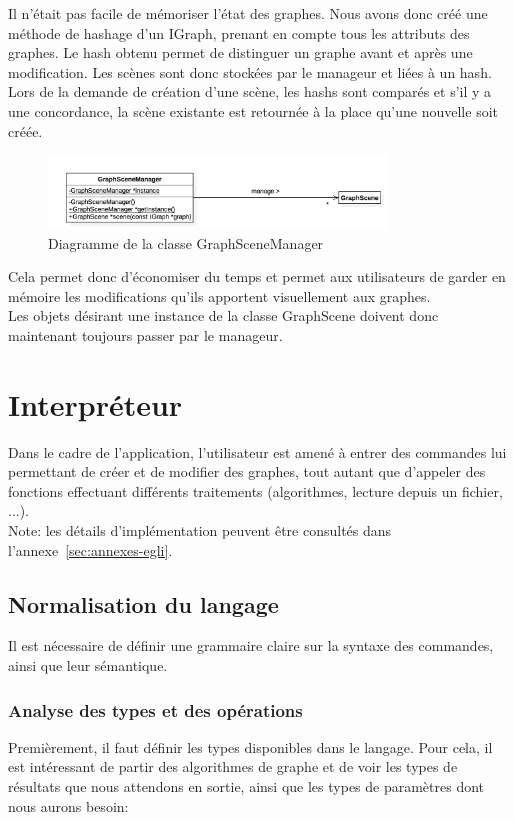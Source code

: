 \documentclass[french]{article}
\begin{document}
	Il n'était pas facile de mémoriser l'état des graphes. Nous avons donc créé une méthode de hashage d'un IGraph, prenant en compte tous les attributs des graphes. Le hash obtenu permet de distinguer un graphe avant et après une modification. Les scènes sont donc stockées par le manageur et liées à un hash. Lors de la demande de création d'une scène, les hashs sont comparés et s'il y a une concordance, la scène existante est retournée à la place qu'une nouvelle soit créée.
	
	\begin{figure}[H]
		\centering
		\includegraphics[width=0.8\textwidth]{Conception/visualization/graphscenemanager.png}
		\caption{Diagramme de la classe GraphSceneManager}
	\end{figure}
	
	Cela permet donc d'économiser du temps et permet aux utilisateurs de garder en mémoire les modifications qu'ils apportent visuellement aux graphes. \\
	
	Les objets désirant une instance de la classe GraphScene doivent donc maintenant toujours passer par le manageur.

	\section{Interpréteur} %
		Dans le cadre de l'application, l'utilisateur est amené à entrer des commandes lui permettant de créer et de modifier des graphes, tout autant que d'appeler des fonctions effectuant différents traitements (algorithmes, lecture depuis un fichier, ...).\\
		
		Note: les détails d'implémentation peuvent être consultés dans l'annexe~\ref{sec:annexes-egli}.
	
		\subsection{Normalisation du langage} 
			Il est nécessaire de définir une grammaire claire sur la syntaxe des commandes, ainsi que leur sémantique.
			
			\subsubsection{Analyse des types et des opérations} 
			\label{subsubsec:analyse-des-types-et-des-operations}
				Premièrement, il faut définir les types disponibles dans le langage. Pour cela, il est intéressant de partir des algorithmes de graphe et de voir les types de résultats que nous attendons en sortie, ainsi que les types de paramètres dont nous aurons besoin:
			
\end{document}
